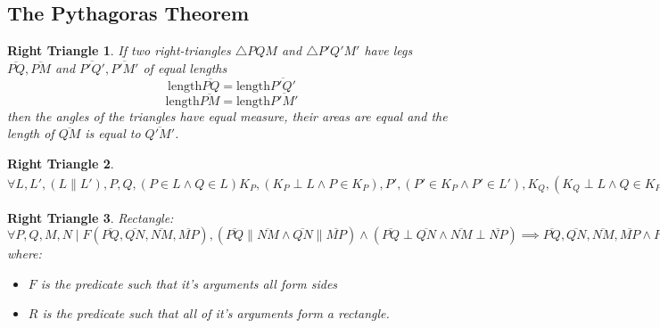 \subsection{The Pythagoras Theorem}
\theoremstyle{plain}
\newtheorem{righttriangle}{Right Triangle}[section]
\begin{righttriangle}
If two right-triangles $\triangle PQM$ and $\triangle P'Q'M'$ have legs $\overline{PQ}, \overline {PM}$ and $\overline{P'Q'}, \overline{P'M'}$ of equal lengths
\[
\text{length} \overline{PQ} = \text{length} \overline{P'Q'}
\]
\[
\text{length} \overline{PM} = \text{length} \overline{P'M'}
\]
then the angles of the triangles have equal measure, their areas are equal and the length of $\overline{QM}$ is equal to $\overline{Q'M'}$.
\end{righttriangle}
\begin{righttriangle}
$\forall L, L', (L \parallel L'), P, Q, (P \in L \land Q \in L)
K_P, (K_P \perp L \land P \in K_P), P', (P' \in K_P \land P' \in L'),
K_Q, (K_Q \perp L \land Q \in K_P), Q', (Q' \in K_Q \land Q' \in L')
\implies \text{length}(\overline{PP'}) = \text{ length}(\overline{QQ'}) \implies d(P, P') = d(Q, Q')$
\end{righttriangle}
\begin{righttriangle}
Rectangle: \newline
$\forall P, Q, M, N \mid F\left(\overline{PQ}, \overline{QN}, \overline{NM}, \overline{MP}\right), (\overline{PQ} \parallel \overline{NM} \land \overline{QN} \parallel \overline{MP}) \land (\overline{PQ} \perp \overline{QN} \land \overline{NM} \perp \overline{NP}) \implies \overline{PQ}, \overline{QN}, \overline{NM}, \overline{MP} \land R\left(P, Q, N, M\right).$
\newline
where:
\begin{itemize}
\item $F$ is the predicate such that it's arguments all form sides
\item $R$ is the predicate such that all of it's arguments form a rectangle.
\end{itemize}
\end{righttriangle}
